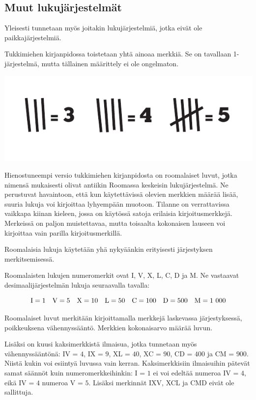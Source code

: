 \subsection*{Muut lukujärjestelmät}

Yleisesti tunnetaan myös joitakin lukujärjestelmiä, jotka eivät ole paikkajärjestelmiä.

Tukkimiehen kirjanpidossa toistetaan yhtä ainoaa merkkiä. Se on tavallaan 1-järjestelmä, mutta tällainen määrittely ei ole ongelmaton.

\begin{center}
	\includegraphics{pictures/Kuva1-1-tukkimiehenkirjanpito.pdf}
\end{center}

Hienostuneempi versio tukkimiehen kirjanpidosta on roomalaiset luvut, jotka nimensä mukaisesti olivat antiikin Roomassa keskeisin lukujärjestelmä.
Ne perustuvat havaintoon, että kun käytettävissä olevien merkkien määrää lisää, suuria lukuja voi kirjoittaa lyhyempään muotoon.
Tilanne on verrattavissa vaikkapa kiinan kieleen, jossa on käytössä satoja erilaisia kirjoitusmerkkejä.
Merkeissä on paljon muistettavaa, mutta toisaalta kokonaisen lauseen voi kirjoittaa vain parilla kirjoitusmerkillä.

Roomalaisia lukuja käytetään yhä nykyäänkin erityisesti järjestyksen merkitsemisessä.

Roomalaisten lukujen numeromerkit ovat I, V, X, L, C, D ja M. Ne vastaavat desimaalijärjestelmän lukuja seuraavalla tavalla:

\begin{equation*}
	\rm I=1\quad
	V=5\quad
	X=10\quad
	L=50\quad
	C=100\quad
	D=500\quad
	M=1~000
\end{equation*}

Roomalaiset luvut merkitään kirjoittamalla merkkejä laskevassa järjestyksessä, poikkeuksena vähennyssääntö. Merkkien kokonaisarvo määrää luvun.

Lisäksi on kuusi kaksimerkkistä ilmaisua, jotka tunnetaan myös vähennyssääntönä: IV = $4$, IX = $9$, XL = $40$, XC = $90$, CD = $400$ ja CM = $900$.
Niistä kukin voi esiintyä luvussa vain kerran. Kaksimerkkisiin ilmaisuihin pätevät samat säännöt kuin numeromerkkeihinkin:
I = $1$ ei voi edeltää numeroa IV = $4$, eikä IV = $4$ numeroa V = $5$. Lisäksi merkinnät IXV, XCL ja CMD eivät ole sallittuja.

